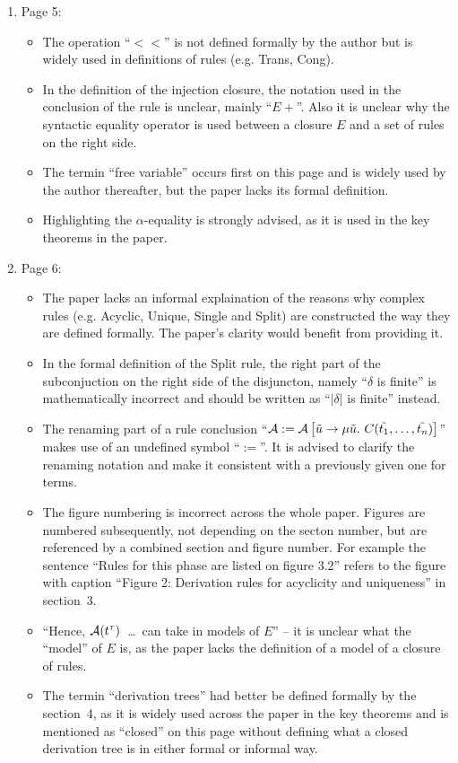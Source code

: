 \begin{enumerate}
	\item Page 5:
	\begin{itemize}
		\item The operation ``$<<$'' is not defined formally by the author but is widely used in definitions of rules (e.g. Trans, Cong).
		\item In the definition of the injection closure, the notation used in the conclusion of the rule is unclear, mainly ``$E+$''. Also it is unclear why the syntactic equality operator is used between a closure $E$ and a set of rules on the right side.
		\item The termin ``free variable'' occurs first on this page and is widely used by the author thereafter, but the paper lacks its formal definition.
		\item Highlighting the $\alpha$-equality is strongly advised, as it is used in the key theorems in the paper.
	\end{itemize}

	\item Page 6:
	\begin{itemize}
		\item The paper lacks an informal explaination of the reasons why complex rules (e.g. Acyclic, Unique, Single and Split) are constructed the way they are defined formally. The paper's clarity would benefit from providing it.
		\item In the formal definition of the Split rule, the right part of the subconjuction on the right side of the disjuncton, namely ``$\delta$ is finite'' is mathematically incorrect and should be written as ``$|\delta|$ is finite'' instead.
		\item The renaming part of a rule conclusion ``$\mathcal{A} := \mathcal{A}\left[ \tilde{u} \rightarrow \mu \tilde{u}.\ C(\tilde{t_1},\dots,\tilde{t_n}) \right]$'' makes use of an undefined symbol ``$:=$''. It is advised to clarify the renaming notation and make it consistent with a previously given one for terms.
		\item The figure numbering is incorrect across the whole paper. Figures are numbered subsequently, not depending on the secton number, but are referenced by a combined section and figure number. For example the sentence ``Rules for this phase are listed on figure 3.2'' refers to the figure with caption ``Figure 2: Derivation rules for acyclicity and uniqueness'' in section~3.
		\item ``Hence, $\mathcal{A}(t^\tau)$~\dots~can take in models of $E$'' -- it is unclear what the ``model'' of $E$ is, as the paper lacks the definition of a model of a closure of rules.
		\item The termin ``derivation trees'' had better be defined formally by the section~4, as it is widely used across the paper in the key theorems and is mentioned as ``closed'' on this page without defining what a closed derivation tree is in either formal or informal way.
	\end{itemize}


\end{enumerate}
